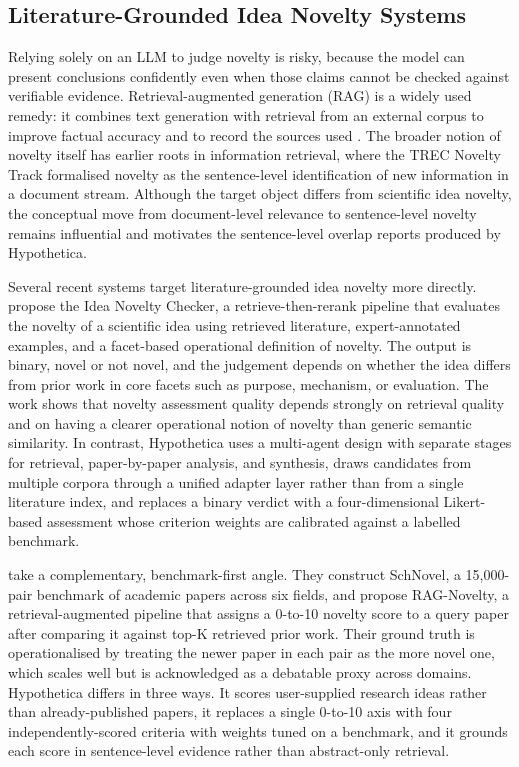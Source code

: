 \subsection{Literature-Grounded Idea Novelty Systems}

Relying solely on an LLM to judge novelty is risky, because the model can present conclusions confidently even when those claims cannot be checked against verifiable evidence. Retrieval-augmented generation (RAG) is a widely used remedy: it combines text generation with retrieval from an external corpus to improve factual accuracy and to record the sources used \citep{lewis2020rag,gao2024ragsurvey}. The broader notion of novelty itself has earlier roots in information retrieval, where the TREC Novelty Track \citep{harman2002trec} formalised novelty as the sentence-level identification of new information in a document stream. Although the target object differs from scientific idea novelty, the conceptual move from document-level relevance to sentence-level novelty remains influential and motivates the sentence-level overlap reports produced by Hypothetica.

Several recent systems target literature-grounded idea novelty more directly. \citet{shahid2025} propose the Idea Novelty Checker, a retrieve-then-rerank pipeline that evaluates the novelty of a scientific idea using retrieved literature, expert-annotated examples, and a facet-based operational definition of novelty. The output is binary, novel or not novel, and the judgement depends on whether the idea differs from prior work in core facets such as purpose, mechanism, or evaluation. The work shows that novelty assessment quality depends strongly on retrieval quality and on having a clearer operational notion of novelty than generic semantic similarity. In contrast, Hypothetica uses a multi-agent design with separate stages for retrieval, paper-by-paper analysis, and synthesis, draws candidates from multiple corpora through a unified adapter layer rather than from a single literature index, and replaces a binary verdict with a four-dimensional Likert-based assessment whose criterion weights are calibrated against a labelled benchmark.

\citet{lin2025schnovel} take a complementary, benchmark-first angle. They construct SchNovel, a 15,000-pair benchmark of academic papers across six fields, and propose RAG-Novelty, a retrieval-augmented pipeline that assigns a 0-to-10 novelty score to a query paper after comparing it against top-K retrieved prior work. Their ground truth is operationalised by treating the newer paper in each pair as the more novel one, which scales well but is acknowledged as a debatable proxy across domains. Hypothetica differs in three ways. It scores user-supplied research ideas rather than already-published papers, it replaces a single 0-to-10 axis with four independently-scored criteria with weights tuned on a benchmark, and it grounds each score in sentence-level evidence rather than abstract-only retrieval.

